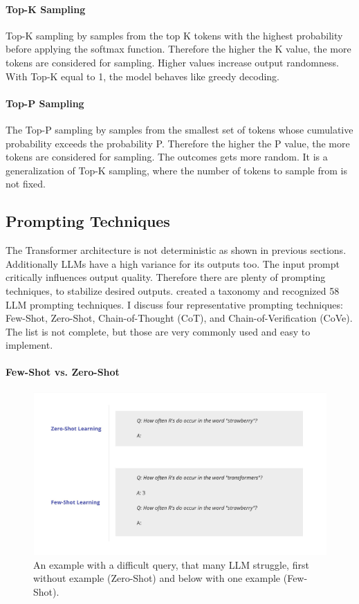 \paragraph{Top-K Sampling}
Top-K sampling by \citet{Fan.13.05.2018} samples from the top K tokens with the highest probability before applying the softmax function. Therefore the higher the K value, the more tokens are considered for sampling. Higher values increase output randomness. With Top-K equal to 1, the model behaves like greedy decoding.

\paragraph{Top-P Sampling}
The Top-P sampling by \citet{Holtzman.22.04.2019} samples from the smallest set of tokens whose cumulative probability exceeds the probability P. Therefore the higher the P value, the more tokens are considered for sampling. The outcomes gets more random. It is a generalization of Top-K sampling, where the number of tokens to sample from is not fixed.

\subsection{Prompting Techniques}
The Transformer architecture is not deterministic as shown in previous sections. Additionally LLMs have a high variance for its outputs too. The input prompt critically influences output quality. Therefore there are plenty of prompting techniques, to stabilize desired outputs. \citet{Schulhoff.06.06.2024} created a taxonomy and recognized 58 LLM prompting techniques. I discuss four representative prompting techniques: Few-Shot, Zero-Shot, Chain-of-Thought (CoT), and Chain-of-Verification (CoVe). The list is not complete, but those are very commonly used and easy to implement.

\paragraph{Few-Shot vs. Zero-Shot}

\begin{figure}[h!]
    \centering
    \includegraphics[width=\textwidth]{images/FewShot vs ZeroSHot.jpg}
    \caption{An example with a difficult query, that many LLM struggle, first without example (Zero-Shot) and below with one example (Few-Shot).}
    \label{fig:FewZeroShot}
\end{figure}


